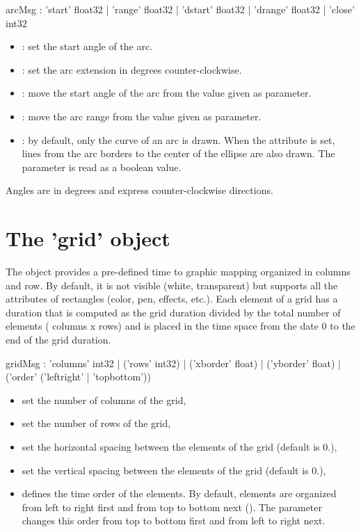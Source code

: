 \documentclass[a4paper,twoside]{report}
\newcommand{\sublevel}[1]	{\section{#1}}
\begin{document}
\begin{rail}
arcMsg :	  'start' 	float32 
			| 'range' 	float32 
			| 'dstart'  float32 
			| 'drange' 	float32 
			| 'close'	int32
\end{rail}

\begin{itemize}
\item {}: 	set the start angle of the arc.
\item {}: 	set the arc extension in degrees counter-clockwise.
\item {}: move the start angle of the arc from the value given as parameter.
\item {}: move the arc range from the value given as parameter.
\item {}: 	by default, only the curve of an arc is drawn. When the  attribute is set, lines from the arc borders to the center of the ellipse are also drawn. The  parameter is read as a boolean value.
\end{itemize} 
Angles are in degrees and express counter-clockwise directions.


\sublevel{The 'grid' object}
\label{grid}

The  object provides a pre-defined time to graphic mapping organized in columns and row. By default, it is not visible (white, transparent) but supports all the attributes of rectangles (color, pen, effects, etc.). Each element of a grid has a duration that is computed as the grid duration divided by the total number of elements ( columns x rows) and is placed in the time space from the date 0 to the end of the grid duration.

\begin{rail}
gridMsg : 'columns' int32
		| ('rows' int32) 
		| ('xborder' float)
		| ('yborder' float)
		| ('order' ('leftright' | 'topbottom'))
\end{rail}

\begin{itemize}
\item {} set the number of columns of the grid,
\item {} set the number of rows of the grid,
\item {} set the horizontal spacing between the elements of the grid (default is 0.),
\item {} set the vertical spacing between the elements of the grid (default is 0.),
\item {} defines the time order of the elements. By default, elements are organized from left to right first and from top to bottom next (). The  parameter changes this order from top to bottom first and from left to right next.
\end{itemize}
\end{document}
